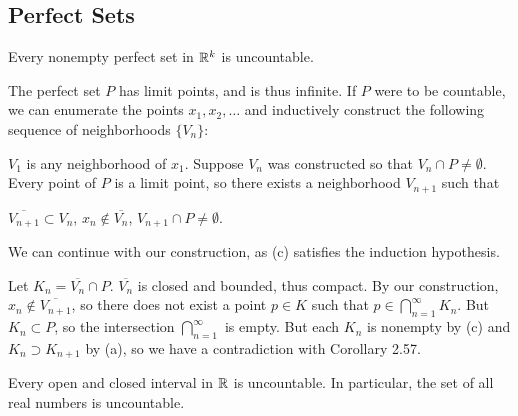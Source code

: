 \documentclass{article}
\begin{document}
\subsection{Perfect Sets}
\begin{theorem}
    Every nonempty perfect set in $\mathbb R^{k}$ is uncountable.
\end{theorem}
\begin{remark}
    The perfect set $P$ has limit points, and is thus infinite. If $P$ were to be countable, we can enumerate the points $x_{1},x_{2},\dotsc$ and inductively construct the following sequence of neighborhoods $\{V_{n}\}$:
    \begin{enumerate}
        \ii $V_{1}$ is any neighborhood of $x_{1}$.
        \ii Suppose $V_{n}$ was constructed so that $V_{n}\cap P\neq\emptyset$. Every point of $P$ is a limit point, so there exists a neighborhood $V_{n+1}$ such that
        \begin{enumerate}
            \ii $\overline{V_{n+1}}\subset V_{n}$,
            \ii $x_{n}\not\in \overline{V_{n}}$,
            \ii $V_{n+1}\cap P\neq\emptyset$.
        \end{enumerate}
        \ii We can continue with our construction, as (c) satisfies the induction hypothesis.
    \end{enumerate}
    Let $K_{n}=\overline{V_{n}}\cap P$. $\overline{V_{n}}$ is closed and bounded, thus compact. By our construction, $x_{n}\not\in \overline{V_{n+1}}$, so there does not exist a point $p\in K$ such that $p\in \bigcap_{n=1}^{\infty}K_{n}$. But $K_{n}\subset P$, so the intersection $\bigcap_{n=1}^{\infty}$ is empty. But each $K_{n}$ is nonempty by (c) and $K_{n}\supset K_{n+1}$ by (a), so we have a contradiction with Corollary 2.57.
\end{remark}
\begin{corollary}
    Every open and closed interval in $\mathbb R$ is uncountable. In particular, the set of all real numbers is uncountable.
\end{corollary}
\end{document}
